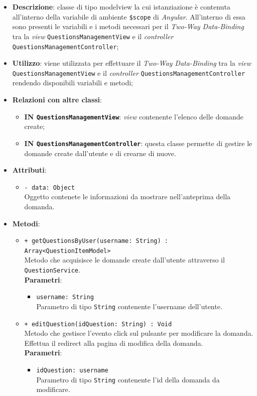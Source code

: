 \begin{itemize}
	\item \textbf{Descrizione}: classe di tipo modelview la cui istanziazione è contenuta all'interno della variabile di ambiente \texttt{\$scope} di \textit{Angular}. All'interno di essa sono presenti le variabili e i metodi necessari per il \textit{Two-Way Data-Binding} tra la \textit{view} \texttt{QuestionsManagementView} e il \textit{controller} \texttt{QuestionsManagementController};
	\item \textbf{Utilizzo}: viene utilizzata per effettuare il \textit{Two-Way Data-Binding} tra la \textit{view} \\\texttt{QuestionsManagementView} e il \textit{controller} \texttt{QuestionsManagementController} rendendo disponibili variabili e metodi;
	\item \textbf{Relazioni con altre classi}: 
	\begin{itemize}
		\item \textbf{IN \texttt{QuestionsManagementView}}: \textit{view} contenente l’elenco delle domande create; 
		\item \textbf{IN \texttt{QuestionsManagementController}}: questa classe permette di gestire le domande create dall’utente e di crearne di nuove.
	\end{itemize}
	\item \textbf{Attributi}: 
	\begin{itemize}
		\item \texttt{- data: Object} \\ Oggetto contenete le informazioni da mostrare nell'anteprima della domanda.
	\end{itemize}
	\item \textbf{Metodi}: 
	\begin{itemize}
			\item \texttt{+ getQuestionsByUser(username: String) : Array<QuestionItemModel>} \\ 
			Metodo che acquisisce le domande create dall'utente attraverso il \texttt{QuestionService}.\\
			\textbf{Parametri}:
			\begin{itemize}
				\item \texttt{username: String} \\
				Parametro di tipo \texttt{String} contenente l'username dell'utente.
			\end{itemize}
			\item \texttt{+ editQuestion(idQuestion: String) : Void} \\ 
			Metodo che gestisce l’evento click sul pulsante per modificare la domanda. Effettua il redirect alla pagina di modifica della domanda. \\
			\textbf{Parametri}:
			\begin{itemize}
				\item \texttt{idQuestion: username} \\
				Parametro di tipo \texttt{String} contenente l'id della domanda da modificare.
			\end{itemize}
	\end{itemize}
\end{itemize}	

